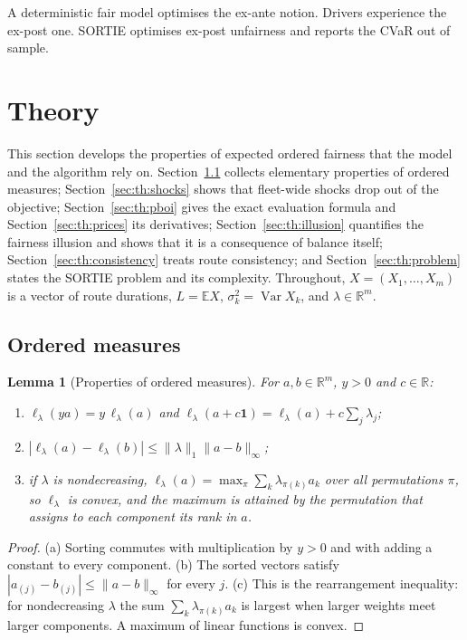 \documentclass[11pt]{article}
\newtheorem{lemma}[theorem]{Lemma}
\theoremstyle{definition}
\newcommand{\E}{\mathbb{E}}
\newcommand{\lord}{\ell_\lambda}
\begin{document}
A deterministic fair model optimises the ex-ante notion. Drivers experience
the ex-post one. SORTIE optimises ex-post unfairness and reports the CVaR out
of sample.

\section{Theory}\label{sec:theory}

This section develops the properties of expected ordered fairness that the
model and the algorithm rely on. Section~\ref{sec:th:prelim} collects
elementary properties of ordered measures; Section~\ref{sec:th:shocks} shows
that fleet-wide shocks drop out of the objective;
Section~\ref{sec:th:pboi} gives the exact evaluation formula and
Section~\ref{sec:th:prices} its derivatives; Section~\ref{sec:th:illusion}
quantifies the fairness illusion and shows that it is a consequence of
balance itself; Section~\ref{sec:th:consistency} treats route consistency;
and Section~\ref{sec:th:problem} states the SORTIE problem and its
complexity. Throughout, $X=(X_1,\dots,X_m)$ is a vector of route durations,
$L=\E X$, $\sigma_k^2=\operatorname{Var}X_k$, and $\lambda\in\mathbb{R}^m$.

\subsection{Ordered measures}\label{sec:th:prelim}

\begin{lemma}[Properties of ordered measures]\label{lem:ordered}
For $a,b\in\mathbb{R}^m$, $y>0$ and $c\in\mathbb{R}$:
\begin{enumerate}
\item[(a)] $\lord(ya)=y\,\lord(a)$ and $\lord(a+c\mathbf 1)=\lord(a)+c\sum_j\lambda_j$;
\item[(b)] $|\lord(a)-\lord(b)|\le\|\lambda\|_1\|a-b\|_\infty$;
\item[(c)] if $\lambda$ is nondecreasing, $\lord(a)=\max_{\pi}\sum_k\lambda_{\pi(k)}a_k$ over
all permutations $\pi$, so $\lord$ is convex, and the maximum is attained by
the permutation that assigns to each component its rank in $a$.
\end{enumerate}
\end{lemma}
\begin{proof}
(a) Sorting commutes with multiplication by $y>0$ and with adding a constant
to every component. (b) The sorted vectors satisfy
$|a_{(j)}-b_{(j)}|\le\|a-b\|_\infty$ for every $j$. (c) This is the
rearrangement inequality: for nondecreasing $\lambda$ the sum
$\sum_k\lambda_{\pi(k)}a_k$ is largest when larger weights meet larger
components. A maximum of linear functions is convex.
\end{proof}
\end{document}
